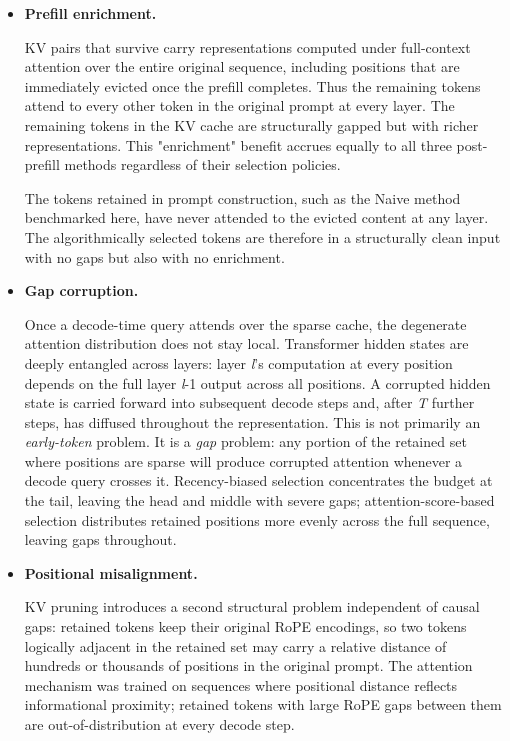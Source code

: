 \documentclass[10pt,letterpaper]{article}
\begin{document}
\begin{itemize}
\item
\textbf{Prefill enrichment.}

KV pairs that survive carry
representations computed under full-context attention over the entire
original sequence, including positions that are immediately
evicted once the prefill completes. Thus the remaining tokens
attend to every other token in the
original prompt at every layer. 
The remaining tokens in the KV cache are structurally gapped but with richer
representations. This "enrichment" benefit accrues equally to all
three post-prefill methods regardless of their selection policies.

The tokens retained in prompt construction,
such as the Naive method benchmarked here, have never attended to the evicted content at any layer.
The algorithmically selected tokens are therefore in a structurally clean 
input with no gaps but also with no enrichment.

\item
\textbf{Gap corruption.}

Once a decode-time query attends over the
sparse cache, the degenerate attention distribution does not stay local.
Transformer hidden states are deeply entangled across layers: layer
\emph{l}'s computation at every position depends on the full layer
\emph{l}-1 output across all positions. A corrupted hidden state is
carried forward into subsequent decode steps and, after \emph{T} further
steps, has diffused throughout the representation. This is not primarily
an \emph{early-token} problem. It is a \emph{gap} problem: any portion
of the retained set where positions are sparse will produce corrupted
attention whenever a decode query crosses it. Recency-biased selection
concentrates the budget at the tail, leaving the head and middle with
severe gaps; attention-score-based selection distributes retained
positions more evenly across the full sequence, leaving gaps throughout.

\item
\textbf{Positional misalignment.}

KV pruning introduces a second
structural problem independent of causal gaps: retained tokens keep
their original RoPE encodings, so two tokens logically adjacent in the
retained set may carry a relative distance of hundreds or thousands of
positions in the original prompt. The attention mechanism was trained on
sequences where positional distance reflects informational proximity;
retained tokens with large RoPE gaps between them are
out-of-distribution at every decode step.


\end{itemize}
\end{document}
